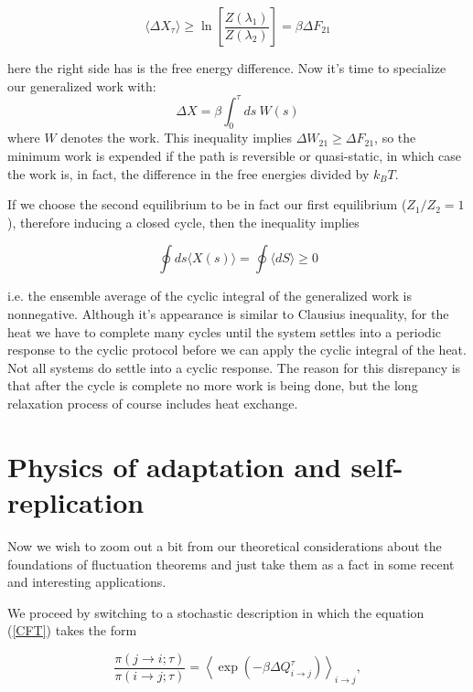 \documentclass[a4paper,12pt]{article}
\begin{document}
\begin{equation}
  \langle \Delta X_\tau \rangle \geq \ln\left[\frac{Z(\lambda_1)}{Z(\lambda_2)}\right]=\beta \Delta F_{21}
\end{equation}

here the right side has is the free energy difference. Now it's time to specialize our generalized work with:
\begin{equation}
  \Delta X = \beta \int_0^\tau ds\ W(s)
\end{equation}
where $W$ denotes the work. This inequality implies $\Delta W_{21} \geq \Delta F_{21} $, so the minimum work is expended if the path is reversible or quasi-static, in which case the work is, in fact, the difference in the free energies divided by $k_B T$.

If we choose the second equilibrium to be in fact our first equilibrium ($Z_1/Z_2=1$), therefore inducing a closed cycle, then the inequality implies

\begin{equation}
\label{CyclicInequalityForGeneralizedWork}
  \oint ds \langle X(s) \rangle = \oint \langle dS \rangle \geq 0
\end{equation}

i.e. the ensemble average of the cyclic integral of the generalized work is nonnegative.
Although it's appearance is similar to Clausius inequality, for the heat we have to complete many cycles until the system settles into a periodic response to the cyclic protocol before we can apply the cyclic integral of the heat. Not all systems do settle into a cyclic response. The reason for this disrepancy is that after the cycle is complete no more work is being done, but the long relaxation process of course includes heat exchange. 

\section{Physics of adaptation and self-replication}

Now we wish to zoom out a bit from our theoretical considerations about the foundations of fluctuation theorems and just take them as a fact in some recent and interesting applications.

We proceed by switching to a stochastic description in which the equation (\ref{CFT}) takes the form

\begin{equation}
\frac{\pi (j\to i;\tau )}{\pi (i\to j;\tau )}=\left\langle \exp \left(-\beta  \Delta Q_{i\to j}^{\tau }\right)\right\rangle_{i\to j},
\end{equation}
\end{document}
